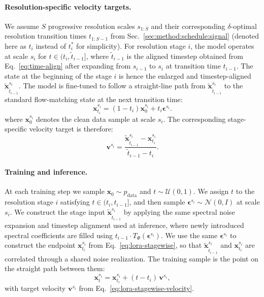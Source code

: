 \paragraph{Resolution-specific velocity targets.} 
We assume $S$ progressive resolution scales $s_{1:S}$ and their corresponding $\delta$-optimal resolution transition times $t_{1:S-1}$ from Sec.~\ref{sec:method:schedule:signal} (denoted here as $t_i$ instead of $t^*_i$ for simplicity). For resolution stage $i$, the model operates at scale $s_i$ for $t \in (t_i, \tilde{t}_{i-1}]$, where $\tilde{t}_{i-1}$ is the aligned timestep obtained from Eq.~\eqref{eq:time-align} after expanding from $s_{i-1}$ to $s_i$ at transition time $t_{i-1}$. The state at the beginning of the stage $i$ is hence the enlarged and timestep-aligned $\tilde{\mathbf{x}}_{\tilde{t}_{i - 1}}^{s_{i}}$. The model is fine-tuned to follow a straight-line path from $\tilde{\mathbf{x}}_{\tilde{t}_{i - 1}}^{s_{i}}$ to the standard flow-matching state at the next transition time:
\begin{equation}
  \mathbf{x}_{t_i}^{s_i}
  =
  (1-t_i)\mathbf{x}_0^{s_i}
  +
  t_i\boldsymbol{\epsilon}^{s_i}.
  \label{eq:lora-stagewise}
\end{equation}
where $\mathbf{x}_0^{s_i}$ denotes the clean data sample at scale $s_i$.
The corresponding stage-specific velocity target is therefore:
\begin{equation}
  \mathbf{v}^{s_i}
  =
  \frac{
  \tilde{\mathbf{x}}_{\tilde{t}_{i - 1}}^{s_{i}}
  -
  \mathbf{x}_{t_i}^{s_i}
  }{
  \tilde{t}_{i - 1} - t_i
  }.
  \label{eq:lora-stagewise-velocity}
\end{equation}

\paragraph{Training and inference.}
At each training step we sample $\mathbf{x}_0 \sim p_\text{data}$ and $t \sim \mathcal{U}(0,1)$. We assign $t$ to the resolution stage $i$ satisfying $t \in (t_i,t_{i-1}]$, and then sample $\boldsymbol{\epsilon}^{s_i} \sim \mathcal{N}(0, I)$ at scale $s_i$. We construct the stage input $\tilde{\mathbf{x}}_{\tilde{t}_{i - 1}}^{s_{i}}$ by
applying the same spectral noise expansion and timestep alignment used at
inference, where newly introduced spectral coefficients are filled using
$t_{i-1} \cdot T_\Phi(\boldsymbol{\epsilon}^{s_i})$. We use the same
$\boldsymbol{\epsilon}^{s_i}$ to construct the endpoint
$\mathbf{x}^{s_i}_{t_i}$ from Eq.~\eqref{eq:lora-stagewise}, so that $\tilde{\mathbf{x}}_{\tilde{t}_{i - 1}}^{s_{i}}$ and $\mathbf{x}^{s_i}_{t_i}$ are correlated through a shared noise realization. The training sample is the point on the straight path between them:
\begin{equation}
  \mathbf{x}_t^{s_i}
  =
  \mathbf{x}_{t_i}^{s_i}
  +
  (t-t_i)\,\mathbf{v}^{s_i},
\end{equation}
with target velocity $\mathbf{v}^{s_i}$ from
Eq.~\eqref{eq:lora-stagewise-velocity}.

